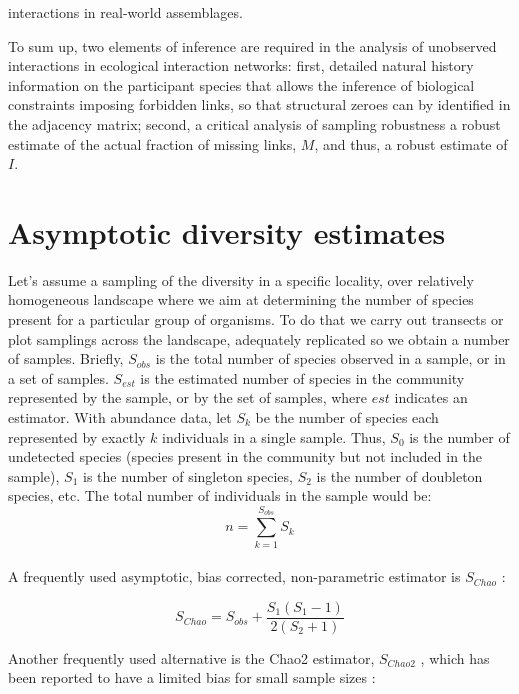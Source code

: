 \documentclass[12pt]{article}
\begin{document}
interactions in real-world assemblages.


To sum up, two elements of inference are required in the analysis of unobserved interactions in ecological interaction networks: first, detailed natural history information on the participant species that allows the inference of biological constraints imposing forbidden links, so that structural zeroes can by identified in the adjacency matrix; second, a critical analysis of sampling robustness a robust estimate of the actual fraction of missing links, $M$, and thus, a robust estimate of $I$. 
\section*{Asymptotic diversity estimates}
\label{asymptoticdiversityestimates}

Let's assume a sampling of the diversity in a specific locality, over relatively homogeneous landscape where we aim at determining the number of species present for a particular group of organisms. To do that we carry out transects or plot samplings across the landscape, adequately replicated so we obtain a number of samples. Briefly, $S_{obs}$ is the total number of species observed in a sample, or in a set of samples. $S_{est}$ is the estimated number of species in the community represented by the sample, or by the set of samples, where $est$ indicates an estimator. With abundance data, let $S_k$ be the number of species each represented by exactly $k$ individuals in a single sample. Thus, $S_0$ is the number of undetected species (species present in the community but not included in the sample), $S_1$ is the number of singleton species, $S_2$ is the number of doubleton species, etc. The total number of individuals in the sample would be:\\
$$n = \sum_{k=1}^{S_{obs}}S_k$$\\
A frequently used asymptotic, bias corrected, non-parametric estimator is $S_{Chao}$ \citep{Hortal:2006dc,Chao:2005wp,Colwell:2013kj}: 

$$S_{Chao}= S_{obs} + \frac{S_1 (S_1-1)}{2(S_2+1)}$$ 

Another frequently used alternative is the Chao2 estimator, $S_{Chao2}$ \citep{Gotelli:2001uo}, which has been reported to have a limited bias for small sample sizes \citep{Colwell:1994vt,Chao:2005wp}: 
\end{document}
